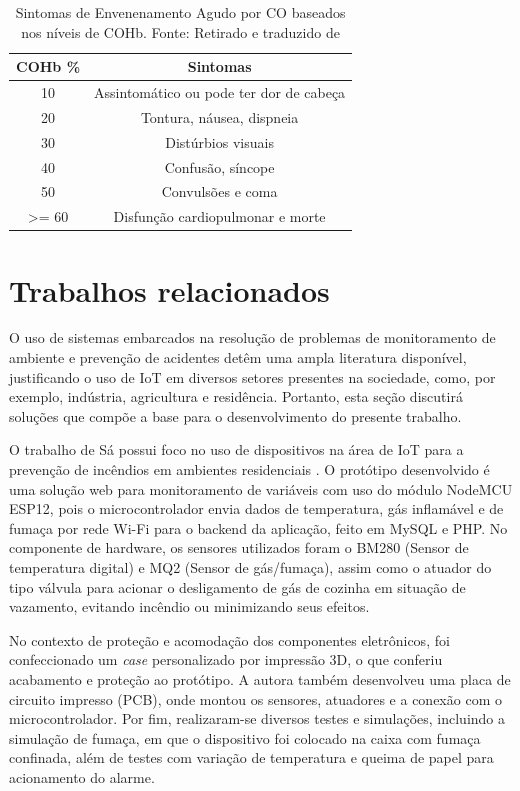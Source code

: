 \begin{table}[h!]
    \centering
    \begin{tabular}{|c|c|}
        \hline
        \textbf{COHb \%} & \textbf{Sintomas} \\
        \hline
        10 & Assintomático ou pode ter dor de cabeça \\
        \hline
        20 & Tontura, náusea, dispneia \\
        \hline
        30 & Distúrbios visuais \\
        \hline
        40 & Confusão, síncope \\
        \hline
        50 & Convulsões e coma \\
        \hline
        >= 60 & Disfunção cardiopulmonar e morte \\
        \hline
    \end{tabular}
    \caption{Sintomas de Envenenamento Agudo por CO baseados nos níveis de COHb. Fonte: Retirado e traduzido de \cite{carbon-monoxide-poisoning-varon}}
\end{table}

\section{Trabalhos relacionados}

O uso de sistemas embarcados na resolução de problemas de monitoramento de ambiente e prevenção 
de acidentes detêm uma ampla literatura disponível, justificando o uso de IoT em diversos setores 
presentes na sociedade, como, por exemplo, indústria, agricultura e residência. Portanto, esta seção 
discutirá soluções que compõe a base para o desenvolvimento do presente trabalho.

O trabalho de Sá possui foco no uso de dispositivos na área de IoT para a prevenção de incêndios em ambientes residenciais \cite{uea-iot-deteccao-incendio}. 
O protótipo desenvolvido é uma solução web para monitoramento de variáveis com uso do módulo NodeMCU ESP12, pois o microcontrolador envia dados de temperatura, gás inflamável e de 
fumaça por rede Wi-Fi para o backend da aplicação, feito em MySQL e PHP. No componente de hardware, os sensores utilizados foram o BM280 (Sensor de temperatura digital) e
MQ2 (Sensor de gás/fumaça), assim como o atuador do tipo válvula para acionar o desligamento de gás de cozinha em situação de vazamento, evitando incêndio ou minimizando seus efeitos.

No contexto de proteção e acomodação dos componentes eletrônicos, foi confeccionado um \textit{case} personalizado por impressão 3D, o que conferiu acabamento 
e proteção ao protótipo. A autora também desenvolveu uma placa de circuito impresso (PCB), onde montou os sensores, atuadores e a conexão com o microcontrolador. Por fim, realizaram-se 
diversos testes e simulações, incluindo a simulação de fumaça, em que o dispositivo foi colocado na caixa com fumaça confinada, além de testes com variação de temperatura e queima de papel para acionamento do alarme. 

